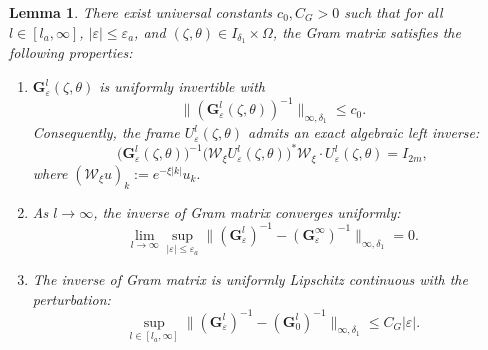 \documentclass[reqno,11pt]{amsart}
\newtheorem{lemma}{Lemma}[section]
\begin{document}
\begin{lemma}\label{prop:extended}
There exist universal constants $c_0, C_G > 0$ such that for all $l \in [l_a,\infty]$, $|\varepsilon| \le \varepsilon_a$, and $(\zeta,\theta) \in I_{\delta_1} \times \Omega$, the Gram matrix satisfies the following properties:

\begin{enumerate}
    \item $\mathbf{G}_\varepsilon^l(\zeta,\theta)$ is uniformly invertible with 
    \begin{equation}\label{eq:Gbound}
        \|(\mathbf{G}_\varepsilon^l(\zeta,\theta))^{-1}\|_{\infty,\delta_1} \le c_0.
    \end{equation}
    Consequently, the frame  $U_\varepsilon^l(\zeta,\theta)$ admits an exact algebraic left inverse:
    \begin{equation}\label{eq:left-inverse}
        \bigl(\mathbf{G}_\varepsilon^l(\zeta,\theta)\bigr)^{-1} \bigl(\mathcal{W}_\xi U_\varepsilon^l(\zeta,\theta)\bigr)^* \mathcal{W}_\xi \cdot  U_\varepsilon^l(\zeta,\theta) = I_{2m},
    \end{equation}
where $
(\mathcal W_\xi u)_k:=e^{-\xi|k|}u_k.
$
    \item  As $l \to \infty$, the inverse of Gram matrix converges uniformly:
    \begin{equation}\label{equ:gramcon}
        \lim_{l\to\infty} \sup_{|\varepsilon|\le \varepsilon_a} \|(\mathbf{G}_\varepsilon^l)^{-1} - (\mathbf{G}_\varepsilon^\infty)^{-1}\|_{\infty,\delta_1} = 0.
    \end{equation}

    \item The inverse of Gram matrix is uniformly Lipschitz continuous with the perturbation:
    \begin{equation}\label{eq:invG}
        \sup_{l\in[l_a,\infty]} \|(\mathbf{G}^{l}_\varepsilon)^{-1} - (\mathbf{G}^{l}_0)^{-1}\|_{\infty,\delta_1} \le C_G |\varepsilon|.
    \end{equation}
\end{enumerate}
\end{lemma}
\end{document}
